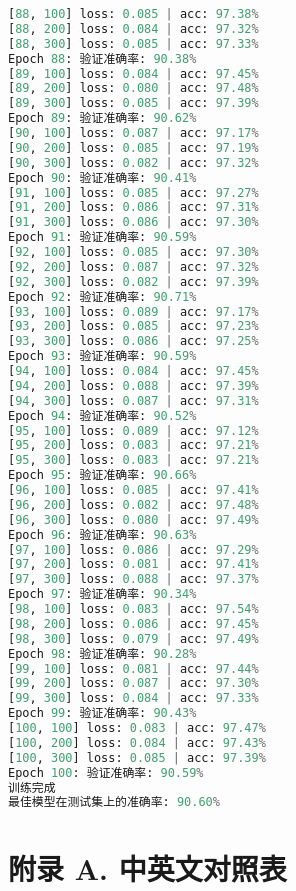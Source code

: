 \documentclass[UTF8]{report}
\theoremstyle{MyLineTheoremStyle} %
\theoremstyle{MyBlockTheoremStyle} %
\theoremstyle{MySubsubsectionStyle} %
\begin{document}
\begin{lstlisting}[language=python, caption={CNN训练结果一}, label={lst:cnn_train_result}]
[88, 100] loss: 0.085 | acc: 97.38%
[88, 200] loss: 0.084 | acc: 97.32%
[88, 300] loss: 0.085 | acc: 97.33%
Epoch 88: 验证准确率: 90.38%
[89, 100] loss: 0.084 | acc: 97.45%
[89, 200] loss: 0.080 | acc: 97.48%
[89, 300] loss: 0.085 | acc: 97.39%
Epoch 89: 验证准确率: 90.62%
[90, 100] loss: 0.087 | acc: 97.17%
[90, 200] loss: 0.085 | acc: 97.19%
[90, 300] loss: 0.082 | acc: 97.32%
Epoch 90: 验证准确率: 90.41%
[91, 100] loss: 0.085 | acc: 97.27%
[91, 200] loss: 0.086 | acc: 97.31%
[91, 300] loss: 0.086 | acc: 97.30%
Epoch 91: 验证准确率: 90.59%
[92, 100] loss: 0.085 | acc: 97.30%
[92, 200] loss: 0.087 | acc: 97.32%
[92, 300] loss: 0.082 | acc: 97.39%
Epoch 92: 验证准确率: 90.71%
[93, 100] loss: 0.089 | acc: 97.17%
[93, 200] loss: 0.085 | acc: 97.23%
[93, 300] loss: 0.086 | acc: 97.25%
Epoch 93: 验证准确率: 90.59%
[94, 100] loss: 0.084 | acc: 97.45%
[94, 200] loss: 0.088 | acc: 97.39%
[94, 300] loss: 0.087 | acc: 97.31%
Epoch 94: 验证准确率: 90.52%
[95, 100] loss: 0.089 | acc: 97.12%
[95, 200] loss: 0.083 | acc: 97.21%
[95, 300] loss: 0.083 | acc: 97.21%
Epoch 95: 验证准确率: 90.66%
[96, 100] loss: 0.085 | acc: 97.41%
[96, 200] loss: 0.082 | acc: 97.48%
[96, 300] loss: 0.080 | acc: 97.49%
Epoch 96: 验证准确率: 90.63%
[97, 100] loss: 0.086 | acc: 97.29%
[97, 200] loss: 0.081 | acc: 97.41%
[97, 300] loss: 0.088 | acc: 97.37%
Epoch 97: 验证准确率: 90.34%
[98, 100] loss: 0.083 | acc: 97.54%
[98, 200] loss: 0.086 | acc: 97.45%
[98, 300] loss: 0.079 | acc: 97.49%
Epoch 98: 验证准确率: 90.28%
[99, 100] loss: 0.081 | acc: 97.44%
[99, 200] loss: 0.087 | acc: 97.30%
[99, 300] loss: 0.084 | acc: 97.33%
Epoch 99: 验证准确率: 90.43%
[100, 100] loss: 0.083 | acc: 97.47%
[100, 200] loss: 0.084 | acc: 97.43%
[100, 300] loss: 0.085 | acc: 97.39%
Epoch 100: 验证准确率: 90.59%
训练完成
最佳模型在测试集上的准确率: 90.60%
\end{lstlisting}














\chapter*{附录 A. 中英文对照表}   
\thispagestyle{plain} 
\setcounter{section}{0}   
\renewcommand\thesection{A.\arabic{section}}   
\renewcommand{\thefigure}{A.\arabic{figure}} 
\renewcommand{\thetable}{A.\arabic{table}}
\end{document}

